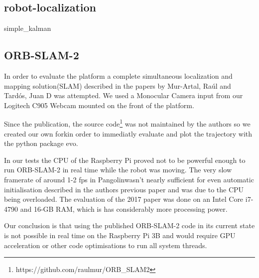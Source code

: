 \documentclass[class=article, crop=false]{standalone}
\begin{document}
\subsection{robot-localization}\label{subsec:robot-localization}

{simple_kalman}

\subsection{ORB-SLAM-2}\label{subsec:orbslam2}
In order to evaluate the platform a complete simultaneous localization and mapping solution(SLAM) described in the papers\cite{mur2017orb}\cite{mur2015orb} by Mur-Artal, Ra\'ul and Tard{\'o}s, Juan D was attempted. We used a Monocular Camera input from our Logitech C905 Webcam mounted on the front of the platform.

Since the publication, the source code\footnote{https://github.com/raulmur/ORB\_SLAM2} was not maintained by the authors so we created our own fork\footnotemark in order to immediatly evaluate and plot the trajectory with the python package evo\cite{grupp2017evo}.


In our tests the CPU of the Raspberry Pi proved not to be powerful enough to run ORB-SLAM-2 in real time while the robot was moving. The very slow framerate of around 1-2 fps in Pangolin\footnotemark wasn't nearly sufficient for even automatic initialisation described in the authors previous paper\cite{mur2015orb} and was due to the CPU being overloaded. The evaluation of the 2017 paper\cite{mur2017orb} was done on an Intel Core i7-4790 and 16-GB RAM, which is has considerably more processing power.


Our conclusion is that using the published ORB-SLAM-2 code in its current state is not possible in real time on the Raspberry Pi 3B and would require GPU acceleration or other code optimisations to run all system threads.
\end{document}
